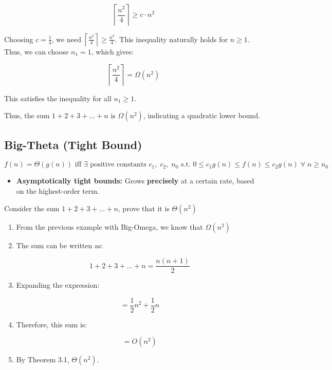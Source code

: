 \begin{example}
\begin{enumerate}
            \[
            \left\lceil \frac{n^2}{4} \right\rceil \geq c \cdot n^2
            \]
        
            Choosing \( c = \frac{1}{4} \), we need \( \left\lceil \frac{n^2}{4} \right\rceil \geq \frac{n^2}{4} \). This inequality naturally holds for \( n \geq 1 \). Thus, we can choose \( n_1 = 1 \), which gives:
        
            \[
            \left\lceil \frac{n^2}{4} \right\rceil = \Omega(n^2)
            \]
        
            This satisfies the inequality for all \( n_1 \geq 1 \).
        \end{enumerate}
        
        Thus, the sum \( 1 + 2 + 3 + \ldots + n \) is \( \Omega(n^2) \), indicating a quadratic lower bound.        
    \end{example}

\subsection{Big-Theta (Tight Bound)}
    \begin{definition}
        $ f(n) = \Theta(g(n)) \text{ iff } \exists \text{ positive constants } c_1, \; c_2, \; n_0 \text{ s.t. } 0 \leq c_1 g(n) \leq f(n) \leq c_2 g(n) \; \forall \; n \geq n_0 $
        \begin{itemize}
            \item \textbf{Asymptotically tight bounds:} Grows \textbf{precisely} at a certain rate, based on the highest-order term.
        \end{itemize}
    \end{definition}

    \begin{example}
        Consider the sum \( 1 + 2 + 3 + \ldots + n \), prove that it is $\Theta(n^2)$
        \begin{enumerate}
            \item From the previous example with Big-Omega, we know that $\Omega(n^2)$
            \item The sum can be written as:

            \[
            1 + 2 + 3 + \ldots + n = \frac{n(n+1)}{2}
            \]
        
            \item Expanding the expression:
        
            \[
            = \frac{1}{2}n^2 + \frac{1}{2}n
            \]
        
            \item Therefore, this sum is:
        
            \[
            = O(n^2)
            \]
            \item By Theorem 3.1, $\Theta(n^2)$.
        \end{enumerate}
    \end{example}

